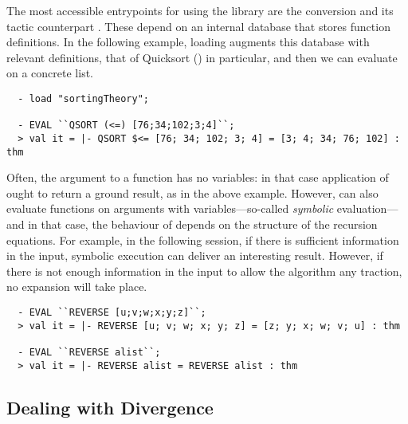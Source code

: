 {The most accessible entrypoints for using the  library
are the conversion  and its tactic counterpart
.  These depend on an internal database that stores
function definitions. In the following example, loading 
augments this database with relevant definitions, that of Quicksort
() in particular, and then we can evaluate
 on a concrete list.
%
\setcounter{sessioncount}{0}
\begin{session}
\begin{hol}
\begin{verbatim}
  - load "sortingTheory";

  - EVAL ``QSORT (<=) [76;34;102;3;4]``;
  > val it = |- QSORT $<= [76; 34; 102; 3; 4] = [3; 4; 34; 76; 102] : thm
\end{verbatim}
\end{hol}
\end{session}
Often, the argument to a function has no variables: in that case
application of  ought to return a ground result,
as in the above example. However,  can also evaluate functions on
arguments with variables---so-called \emph{symbolic} evaluation---and
in that case, the behaviour of  depends on the structure of the
recursion equations. For example, in the following session, if there is
sufficient information in the input, symbolic execution can deliver
an interesting result. However, if there is not enough information
in the input to allow the algorithm any traction, no expansion will
take place.
%
\begin{session}
\begin{hol}
\begin{verbatim}
  - EVAL ``REVERSE [u;v;w;x;y;z]``;
  > val it = |- REVERSE [u; v; w; x; y; z] = [z; y; x; w; v; u] : thm

  - EVAL ``REVERSE alist``;
  > val it = |- REVERSE alist = REVERSE alist : thm
\end{verbatim}
\end{hol}
\end{session}
%

\subsection{Dealing with Divergence}

}
